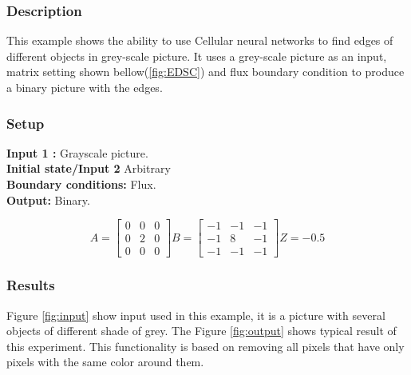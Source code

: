 \subsubsection{Description}
This example shows the ability to use Cellular neural networks to find edges of different objects in grey-scale picture. It uses a grey-scale picture as an input, matrix setting shown bellow(\ref{fig:EDSC}) and flux boundary condition to produce a binary picture with the edges.
\subsubsection{Setup}

\textbf{Input 1 :} Grayscale picture.\\
\textbf{Initial state/Input 2} Arbitrary\\
\textbf{Boundary conditions:} Flux.\\
\textbf{Output:} Binary.\\

\begin{minipage}{0.9\linewidth}
\begin{equation}
A =
\begin{bmatrix}
 0 & 0 & 0 \\
 0 & 2 & 0 \\
 0 & 0 & 0
\end{bmatrix}
B =
\begin{bmatrix}
 -1 & -1 & -1 \\
 -1 & 8 & -1 \\
 -1 & -1 & -1
\end{bmatrix}
Z = -0.5
\end{equation}
\label{fig:EDSC}
\end{minipage}


\subsubsection{Results}
Figure \ref{fig:input} show input used in this example, it is a picture with several objects of different shade of grey. The Figure \ref{fig:output} shows typical result of this experiment. This functionality is based on removing all pixels that have only pixels with the same color around them. \\

